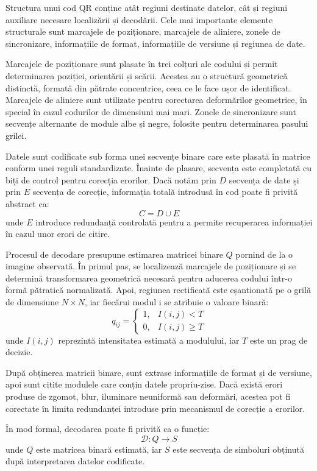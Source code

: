 Structura unui cod QR conține atât regiuni destinate datelor, cât și regiuni auxiliare necesare localizării și decodării. Cele mai importante elemente structurale sunt marcajele de poziționare, marcajele de aliniere, zonele de sincronizare, informațiile de format, informațiile de versiune și regiunea de date.

Marcajele de poziționare sunt plasate în trei colțuri ale codului și permit determinarea poziției, orientării și scării. Acestea au o structură geometrică distinctă, formată din pătrate concentrice, ceea ce le face ușor de identificat. Marcajele de aliniere sunt utilizate pentru corectarea deformărilor geometrice, în special în cazul codurilor de dimensiuni mai mari. Zonele de sincronizare sunt secvențe alternante de module albe și negre, folosite pentru determinarea pasului grilei.

Datele sunt codificate sub forma unei secvențe binare care este plasată în matrice conform unei reguli standardizate. Înainte de plasare, secvența este completată cu biți de control pentru corecția erorilor. Dacă notăm prin \(D\) secvența de date și prin \(E\) secvența de corecție, informația totală introdusă în cod poate fi privită abstract ca:
\[
    C = D \cup E
\]
unde \(E\) introduce redundanță controlată pentru a permite recuperarea informației în cazul unor erori de citire.

Procesul de decodare presupune estimarea matricei binare \(Q\) pornind de la o imagine observată. În primul pas, se localizează marcajele de poziționare și se determină transformarea geometrică necesară pentru aducerea codului într-o formă pătratică normalizată. Apoi, regiunea rectificată este eșantionată pe o grilă de dimensiune \(N \times N\), iar fiecărui modul i se atribuie o valoare binară:
\[
    q_{ij} =
    \begin{cases}
        1, & I(i,j) < T \\
        0, & I(i,j) \geq T
    \end{cases}
\]
unde \(I(i,j)\) reprezintă intensitatea estimată a modulului, iar \(T\) este un prag de decizie.

După obținerea matricii binare, sunt extrase informațiile de format și de versiune, apoi sunt citite modulele care conțin datele propriu-zise. Dacă există erori produse de zgomot, blur, iluminare neuniformă sau deformări, acestea pot fi corectate în limita redundanței introduse prin mecanismul de corecție a erorilor.

În mod formal, decodarea poate fi privită ca o funcție:
\[
    \mathcal{D}: Q \rightarrow S
\]
unde \(Q\) este matricea binară estimată, iar \(S\) este secvența de simboluri obținută după interpretarea datelor codificate.

